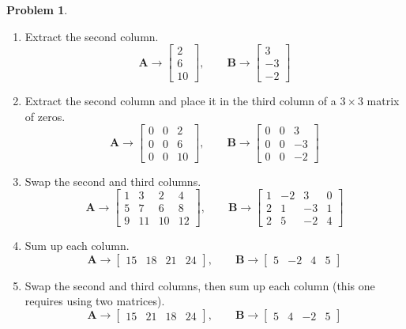 \documentclass[12pt]{article}
\theoremstyle{definition}
\newtheorem{problem}{Problem}
\renewcommand{\vec}{\mathbf}
\begin{document}
\begin{problem}
    \begin{enumerate}
        \item Extract the second column.
            \[
                \vec{A} \to \begin{bmatrix} 2 \\ 6 \\ 10 \end{bmatrix}
                    ,\qquad
                    \vec{B} \to \begin{bmatrix} 3 \\ -3 \\ -2 \end{bmatrix}
            \]
        \item Extract the second column and place it in the third column of a $3\times 3$ matrix of zeros.
            \[
                    \vec{A} \to \begin{bmatrix} 0&0&2 \\ 0&0&6 \\ 0&0&10 \end{bmatrix}
                    ,\qquad
                    \vec{B} \to \begin{bmatrix} 0&0&3 \\ 0&0&-3 \\ 0&0&-2 \end{bmatrix}
            \]
        \item Swap the second and third columns.
    \[
        \vec{A} \to 
        \begin{bmatrix}
            1 & 3 & 2 & 4 \\
            5 & 7 & 6 & 8 \\
            9 & 11 & 10 & 12
        \end{bmatrix}
        ,\qquad 
        \vec{B} \to
        \begin{bmatrix}
            1 & -2 & 3& 0 \\
            2 & 1 & -3 & 1 \\
            2 & 5 & -2 & 4
        \end{bmatrix}
    \]
    \item Sum up each column.
    \[
        \vec{A} \to  
        \begin{bmatrix}
            15 & 18 & 21 & 24 
        \end{bmatrix}
        ,\qquad 
        \vec{B} \to 
        \begin{bmatrix}
            5 & -2 & 4 & 5
        \end{bmatrix}
    \]
    \item Swap the second and third columns, then sum up each column  (this one requires using two matrices).
    \[
        \vec{A} \to  
        \begin{bmatrix}
            15 & 21 & 18 & 24 
        \end{bmatrix}
        ,\qquad 
        \vec{B} \to 
        \begin{bmatrix}
            5 & 4 & -2 & 5
        \end{bmatrix}
    \]


\end{enumerate}
\end{problem}
\end{document}
